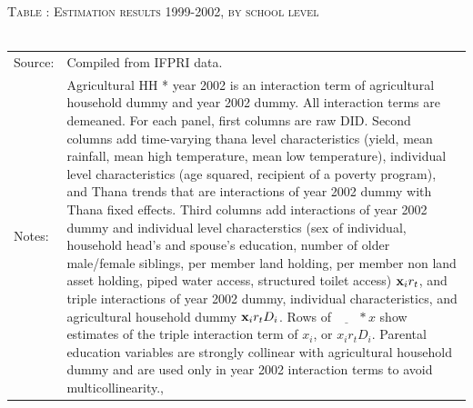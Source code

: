 \documentclass[12pt,letterpaper]{article}\usepackage[margin=1in]{geometry}
\newcommand{\bfx}{\ensuremath{\mbox{\bf x}}}
\newcommand{\0}{\ensuremath{\mbox{\boldmath $0$}}}
\begin{document}
{\begin{table}\hfil\textsc{\footnotesize Table \thetable: Estimation results 1999-2002, by school level\label{MainGenderAgeGroup2Results}}\\\setlength{\tabcolsep}{.5pt}\renewcommand{\arraystretch}{.675}\hspace{-2em}\hfil\\\renewcommand{\arraystretch}{1}\hfil\begin{tabular}{>{\hfill\scriptsize}p{1cm}<{}>{\scriptsize}p{12cm}<{\hfill}} Source:& Compiled from IFPRI data. \\[-1ex] Notes:&   \textsf{Agricultural HH * year 2002} is an interaction term of agricultural household dummy and year 2002 dummy. All interaction terms are demeaned. For each panel, first columns are raw DID. Second columns add time-varying thana level characteristics (yield, mean rainfall, mean high temperature, mean low temperature), individual level characteristics (age squared, recipient of a poverty program), and \textsf{Thana trends} that are interactions of year 2002 dummy with Thana fixed effects. Third columns add interactions of year 2002 dummy and individual level characterstics (sex of individual, household head's and spouse's education, number of older male/female siblings, per member land holding, per member non land asset holding, piped water access, structured toilet access) $\bfx_{i}r_{t}$, and triple interactions of year 2002 dummy, individual characteristics, and agricultural household dummy $\bfx_{i}r_{t}D_{i}$. Rows of $\underline{\phantom{mm}}*x$ show estimates of the triple interaction term of $x_{i}$, or $x_{i}r_{t}D_{i}$. Parental education variables are strongly collinear with agricultural household dummy and are used only in year 2002 interaction terms to avoid multicollinearity., \\   \end{tabular} \end{table}



}
\end{document}
